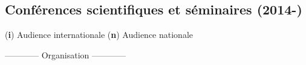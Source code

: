 \documentclass{article}
\newcommand{\fr}[1]{#1}       %
\newcommand{\en}[1]{}     %
\begin{document}
\bigbreak

\subsection*{\fr{Conférences scientifiques et séminaires (2014-)}\en{Scientific Conferences and Seminars (2014-)}}

\begin{center}
\fr{(\textbf{i}) Audience internationale {\textbar} (\textbf{n}) Audience nationale}
\en{(\textbf{i}) International Audience {\textbar} (\textbf{n}) National Audience}
\end{center}

\smallbreak

\begin{center}
\fr{------------ Organisation ------------}
\en{------------ Organization ------------}
\end{center}
\end{document}

